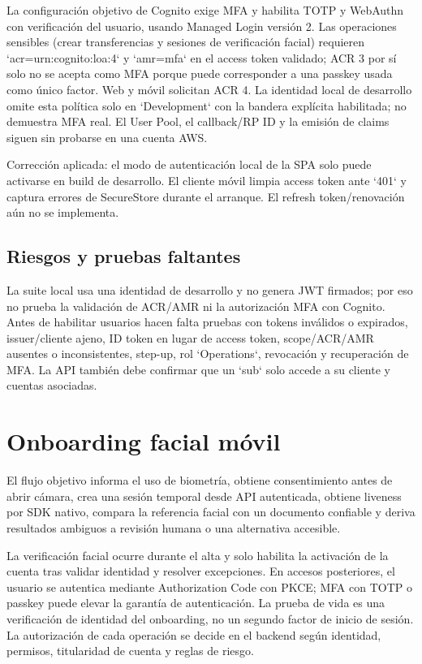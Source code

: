 \documentclass[11pt,a4paper]{report}
\begin{document}
La configuración objetivo de Cognito exige MFA y habilita TOTP y WebAuthn con verificación del usuario, usando Managed Login versión 2. Las operaciones sensibles (crear transferencias y sesiones de verificación facial) requieren `acr=urn:cognito:loa:4` y `amr=mfa` en el access token validado; ACR 3 por sí solo no se acepta como MFA porque puede corresponder a una passkey usada como único factor. Web y móvil solicitan ACR 4. La identidad local de desarrollo omite esta política solo en `Development` con la bandera explícita habilitada; no demuestra MFA real. El User Pool, el callback/RP ID y la emisión de claims siguen sin probarse en una cuenta AWS.

\begin{summarybox}
Corrección aplicada: el modo de autenticación local de la SPA solo puede activarse en build de desarrollo. El cliente móvil limpia access token ante `401` y captura errores de SecureStore durante el arranque. El refresh token/renovación aún no se implementa.
\end{summarybox}

\section{Riesgos y pruebas faltantes}
La suite local usa una identidad de desarrollo y no genera JWT firmados; por eso no prueba la validación de ACR/AMR ni la autorización MFA con Cognito. Antes de habilitar usuarios hacen falta pruebas con tokens inválidos o expirados, issuer/cliente ajeno, ID token en lugar de access token, scope/ACR/AMR ausentes o inconsistentes, step-up, rol `Operations`, revocación y recuperación de MFA. La API también debe confirmar que un `sub` solo accede a su cliente y cuentas asociadas.

\chapter{Onboarding facial móvil}
El flujo objetivo informa el uso de biometría, obtiene consentimiento antes de abrir cámara, crea una sesión temporal desde API autenticada, obtiene liveness por SDK nativo, compara la referencia facial con un documento confiable y deriva resultados ambiguos a revisión humana o una alternativa accesible.

La verificación facial ocurre durante el alta y solo habilita la activación de la cuenta tras validar identidad y resolver excepciones. En accesos posteriores, el usuario se autentica mediante Authorization Code con PKCE; MFA con TOTP o passkey puede elevar la garantía de autenticación. La prueba de vida es una verificación de identidad del onboarding, no un segundo factor de inicio de sesión. La autorización de cada operación se decide en el backend según identidad, permisos, titularidad de cuenta y reglas de riesgo.
\end{document}
